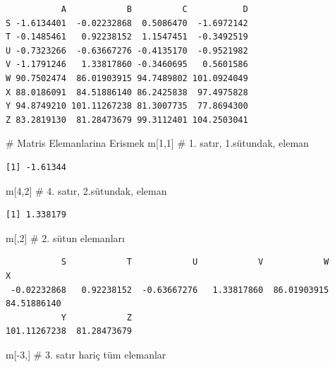 \documentclass[
  letterpaper,
  DIV=11,
  numbers=noendperiod]{scrreprt}
\newenvironment{Shaded}{\begin{snugshade}}{\end{snugshade}}
\newcommand{\CommentTok}[1]{\textcolor[rgb]{0.37,0.37,0.37}{#1}}
\newcommand{\DecValTok}[1]{\textcolor[rgb]{0.68,0.00,0.00}{#1}}
\newcommand{\NormalTok}[1]{\textcolor[rgb]{0.00,0.23,0.31}{#1}}
\newcommand{\SpecialCharTok}[1]{\textcolor[rgb]{0.37,0.37,0.37}{#1}}
\begin{document}
\begin{verbatim}
           A            B          C           D
S -1.6134401  -0.02232868  0.5086470  -1.6972142
T -0.1485461   0.92238152  1.1547451  -0.3492519
U -0.7323266  -0.63667276 -0.4135170  -0.9521982
V -1.1791246   1.33817860 -0.3460695   0.5601586
W 90.7502474  86.01903915 94.7489802 101.0924049
X 88.0186091  84.51886140 86.2425838  97.4975828
Y 94.8749210 101.11267238 81.3007735  77.8694300
Z 83.2819130  81.28473679 99.3112401 104.2503041
\end{verbatim}

\begin{Shaded}
\begin{Highlighting}[]
\CommentTok{\# Matris Elemanlarina Erismek}
\NormalTok{m[}\DecValTok{1}\NormalTok{,}\DecValTok{1}\NormalTok{] }\CommentTok{\# 1. satır, 1.sütundak, eleman}
\end{Highlighting}
\end{Shaded}

\begin{verbatim}
[1] -1.61344
\end{verbatim}

\begin{Shaded}
\begin{Highlighting}[]
\NormalTok{m[}\DecValTok{4}\NormalTok{,}\DecValTok{2}\NormalTok{] }\CommentTok{\# 4. satır, 2.sütundak, eleman}
\end{Highlighting}
\end{Shaded}

\begin{verbatim}
[1] 1.338179
\end{verbatim}

\begin{Shaded}
\begin{Highlighting}[]
\NormalTok{m[,}\DecValTok{2}\NormalTok{] }\CommentTok{\# 2. sütun elemanları}
\end{Highlighting}
\end{Shaded}

\begin{verbatim}
           S            T            U            V            W            X 
 -0.02232868   0.92238152  -0.63667276   1.33817860  86.01903915  84.51886140 
           Y            Z 
101.11267238  81.28473679 
\end{verbatim}

\begin{Shaded}
\begin{Highlighting}[]
\NormalTok{m[}\SpecialCharTok{{-}}\DecValTok{3}\NormalTok{,] }\CommentTok{\# 3. satır hariç tüm elemanlar}
\end{Highlighting}
\end{Shaded}
\end{document}

